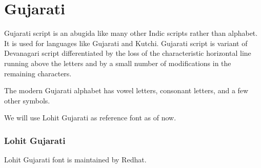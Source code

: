 \chapter{Gujarati}

Gujarati script is an abugida like many other Indic scripts rather than
alphabet. It is used for languages like Gujarati and Kutchi. Gujarati script is
variant of Devanagari script differentiated by the loss of the characteristic
horizontal line running above the letters and by a small number of
modifications in the remaining characters.

The modern Gujarati alphabet has vowel letters, consonant letters, and a few
other symbols.


We will use Lohit Gujarati as reference font as of now.

\subsection{Lohit Gujarati}

Lohit Gujarati font is maintained by Redhat.
